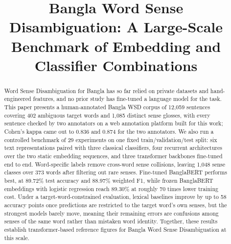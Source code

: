 \documentclass[conference]{IEEEtran}
\begin{document}
\addtolength{\textheight}{1.1cm}
\renewcommand{\arraystretch}{0.72}
\setlength{\textfloatsep}{6pt plus 2pt minus 2pt}
\setlength{\floatsep}{4pt plus 2pt minus 2pt}
\setlength{\intextsep}{6pt plus 2pt minus 2pt}
\setlength{\abovecaptionskip}{3pt}
\setlength{\belowcaptionskip}{2pt}

\title{Bangla Word Sense Disambiguation: A Large-Scale Benchmark of Embedding and Classifier Combinations
}

\author{
\and
{}
}

\maketitle

\begin{abstract}
Word Sense Disambiguation for Bangla has so far relied on private datasets and hand-engineered features, and no prior study has fine-tuned a language model for the task. This paper presents a human-annotated Bangla WSD corpus of 12,059 sentences covering 402 ambiguous target words and 1,085 distinct sense glosses, with every sentence checked by two annotators on a web annotation platform built for this work; Cohen's kappa came out to 0.836 and 0.874 for the two annotators. We also run a controlled benchmark of 29 experiments on one fixed train/validation/test split: six text representations paired with three classical classifiers, four recurrent architectures over the two static embedding sequences, and three transformer backbones fine-tuned end to end. Word-specific labels remove cross-word sense collisions, leaving 1,048 sense classes over 373 words after filtering out rare senses. Fine-tuned BanglaBERT performs best, at 89.72\% test accuracy and 88.97\% weighted F1, while frozen BanglaBERT embeddings with logistic regression reach 89.30\% at roughly 70 times lower training cost. Under a target-word-constrained evaluation, lexical baselines improve by up to 58 accuracy points once predictions are restricted to the target word's own senses, but the strongest models barely move, meaning their remaining errors are confusions among senses of the same word rather than mistaken word identity. Together, these results establish transformer-based reference figures for Bangla Word Sense Disambiguation at this scale.
\end{abstract}
\end{document}
